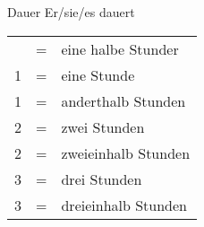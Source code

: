\begin{semantics}{Dauer}{}
Er/sie/es dauert \fillhere

\begin{mdframed}
\begin{tabular}{lll}
	\textonehalf	& = & eine halbe Stunder \\
	1				& = & eine Stunde \\
	1\textonehalf	& = & anderthalb Stunden \\
	2				& = & zwei Stunden \\
	2\textonehalf	& = & zweieinhalb Stunden \\
	3				& = & drei Stunden \\
	3\textonehalf	& = & dreieinhalb Stunden
\end{tabular}
\end{mdframed}
\end{semantics}
